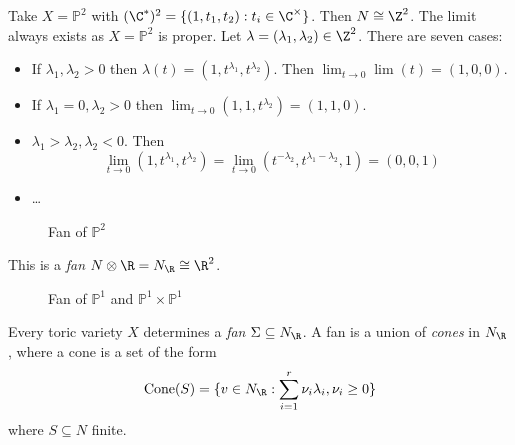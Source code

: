 \documentclass[a4paper]{article}
\renewcommand*{\P}{\mathbb{P}}
\begin{document}
\begin{eg}
  Take \(X = \P^2\) with \((\C^*)^2 = \{(1, t_1, t_2): t_i \in \C^\times\}\). Then \(N \cong \Z^2\). The limit always exists as \(X = \P^2\) is proper. Let \(\lambda = (\lambda_1, \lambda_2) \in \Z^2\). There are seven cases:
  \begin{itemize}
  \item If \(\lambda_1, \lambda_2 > 0\) then \(\lambda(t) = (1, t^{\lambda_1}, t^{\lambda_2})\). Then \(\lim_{t \to 0} \lim(t) = (1, 0, 0)\).
  \item If \(\lambda_1 = 0, \lambda_2 > 0\) then \(\lim_{t \to 0} (1, 1, t^{\lambda_2}) = (1, 1, 0)\).
  \item \(\lambda_1 > \lambda_2, \lambda_2 < 0\). Then
    \[
      \lim_{t \to 0} (1, t^{\lambda_1}, t^{\lambda_2})
      = \lim_{t \to 0} (t^{-\lambda_2}, t^{\lambda_1 - \lambda_2}, 1)
      = (0, 0, 1)
    \]
  \item \dots
  \end{itemize}
  \begin{figure}[ht]
    \centering
    \def\svgwidth{.3\columnwidth}
    
    \caption{Fan of \(\P^2\)}
  \end{figure}
  This is a \emph{fan} \(N \otimes \R = N_\R \cong \R^2\).
\end{eg}

\begin{figure}[ht]
  \centering
  \begin{minipage}{0.5\textwidth}
    \centering
    \def\svgwidth{.8\columnwidth}
    
  \end{minipage}%
  \begin{minipage}{0.5\textwidth}
    \centering
    \def\svgwidth{.8\columnwidth}
    
  \end{minipage}
  \caption{Fan of \(\P^1\) and \(\P^1 \times \P^1\)}
\end{figure}

Every toric variety \(X\) determines a \emph{fan} \(\Sigma \subseteq N_\R\). A fan is a union of \emph{cones} in \(N_\R\), where a cone is a set of the form
\[
  \operatorname{Cone}(S) = \{v \in N_\R: \sum_{i = 1}^r \nu_i \lambda_i, \nu_i \geq 0\}
\]
where \(S \subseteq N\) finite.






\iffalse
Multi-index notation: if \(\alpha = (\alpha_1, \dots, \alpha_n) \in \N^n\) then
\[
  X^\alpha = x_1^{\alpha_1} \cdots x_n^{\alpha_n}.
\]
\fi

\printindex
\end{document}
